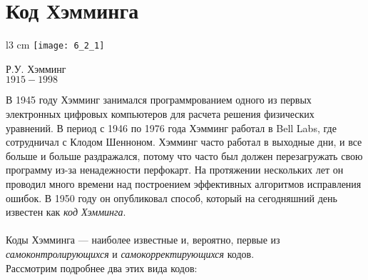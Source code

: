 \section{Код Хэмминга}
\begin{wrapfigure}[14]{l}{3 cm}
\texttt{[image: 6\_2\_1]}
\begin{center}
\caption{}
\footnotesize{Р.У. Хэмминг}
\\\footnotesize{$1915 - 1998$}
\end{center}
\end{wrapfigure}
В 1945 году Хэмминг занимался программрованием одного из первых электронных цифровых компьютеров для расчета решения физических уравнений.  В период с 1946 по 1976 года Хэмминг работал в Bell Labs, где сотрудничал с Клодом Шенноном. Хэмминг часто работал в выходные дни, и все больше и больше раздражался, потому что часто был должен перезагружать свою программу из-за ненадежности перфокарт. На протяжении нескольких лет он проводил много времени над построением эффективных алгоритмов исправления ошибок. В 1950 году он опубликовал способ, который на сегодняшний день известен как \emph{код Хэмминга}. \\\\Коды Хэмминга — наиболее известные и, вероятно, первые из \emph{самоконтролирующихся} и \emph{самокорректирующихся} кодов.\\
Рассмотрим подробнее два этих вида кодов:
